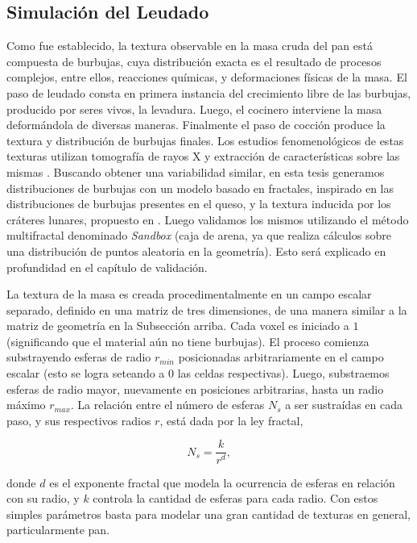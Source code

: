 \documentclass[spanish,a4paper,openright,11pt]{book}
\begin{document}
\subsection{Simulación del Leudado}
\label{breadprov}
Como fue establecido, la textura observable en la masa cruda del pan está compuesta de burbujas, cuya distribución exacta es el resultado de procesos complejos, entre ellos, reacciones químicas, y deformaciones físicas de la masa.
El paso de leudado consta en primera instancia del crecimiento libre de las burbujas, producido por seres vivos, la levadura.
Luego, el cocinero interviene la masa deformándola de diversas maneras.
Finalmente el paso de cocción produce la textura y distribución de burbujas finales.
Los estudios fenomenológicos de estas texturas utilizan tomografía de rayos X y extracción de características sobre las mismas \cite{Babin2006,Gonzales2008,VanDyck2014}.
Buscando obtener una variabilidad similar, en esta tesis generamos distribuciones de burbujas con un modelo basado en fractales, inspirado en las distribuciones de burbujas presentes en el queso, y la textura inducida por los cráteres lunares, propuesto en \cite{Mandelbrot1982}.
Luego validamos los mismos utilizando el método multifractal denominado {\em Sandbox} (caja de arena, ya que realiza cálculos sobre una distribución de puntos aleatoria en la geometría).
Esto será explicado en profundidad en el capítulo de validación.

La textura de la masa es creada procedimentalmente en un campo escalar separado, definido en una matriz de tres dimensiones, de una manera similar a la matriz de geometría en la Subsección arriba.
Cada voxel es iniciado a $1$ (significando que el material aún no tiene burbujas).
El proceso comienza substrayendo esferas de radio $r_{min}$ posicionadas arbitrariamente en el campo escalar (esto se logra seteando a $0$ las celdas respectivas).
Luego, substraemos esferas de radio mayor, nuevamente en posiciones arbitrarias, hasta un radio máximo $r_{max}$.
La relación entre el número de esferas $N_{s}$ a ser sustraídas en cada paso, y sus respectivos radios $r$, está dada por la ley fractal,


\begin{equation*}
N_{s} = \frac{k}{r^{d}},
\end{equation*}

donde $d$ es el exponente fractal que modela la ocurrencia de esferas en relación con su radio, y $k$ controla la cantidad de esferas para cada radio.
Con estos simples parámetros basta para modelar una gran cantidad de texturas en general, particularmente pan.
\end{document}
